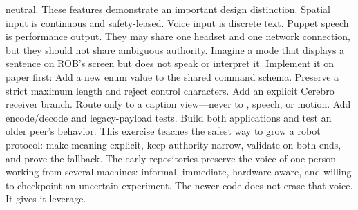 {}neutral.\markdownRendererUlItemEnd 
\markdownRendererUlEnd \markdownRendererInterblockSeparator
{}These features demonstrate an important design distinction. Spatial input is\markdownRendererSoftLineBreak
{}continuous and safety-leased. Voice input is discrete text. Puppet speech is\markdownRendererSoftLineBreak
{}performance output. They may share one headset and one network connection, but\markdownRendererSoftLineBreak
{}they should not share ambiguous authority.\markdownRendererInterblockSeparator
{}
\markdownRendererSectionEnd \markdownRendererSectionBegin
{}\markdownRendererInterblockSeparator
{}Imagine a  mode that displays a sentence on ROB's screen but does\markdownRendererSoftLineBreak
{}not speak or interpret it. Implement it on paper first:\markdownRendererInterblockSeparator
{}\markdownRendererOlBegin
{}Add a new enum value to the shared command schema.\markdownRendererOlItemEnd 
{}Preserve a strict maximum length and reject control characters.\markdownRendererOlItemEnd 
{}Add an explicit Cerebro receiver branch.\markdownRendererOlItemEnd 
{}Route only to a caption view—never to , speech, or motion.\markdownRendererOlItemEnd 
{}Add encode/decode and legacy-payload tests.\markdownRendererOlItemEnd 
{}Build both applications and test an older peer's behavior.\markdownRendererOlItemEnd 
\markdownRendererOlEnd \markdownRendererInterblockSeparator
{}This exercise teaches the safest way to grow a robot protocol: make meaning\markdownRendererSoftLineBreak
{}explicit, keep authority narrow, validate on both ends, and prove the fallback.\markdownRendererInterblockSeparator
{}\markdownRendererThematicBreak{}\markdownRendererInterblockSeparator
{}
\markdownRendererSectionEnd 
\markdownRendererSectionEnd \markdownRendererSectionBegin
{}\markdownRendererInterblockSeparator
{}The early repositories preserve the voice of one person working from several\markdownRendererSoftLineBreak
{}machines: informal, immediate, hardware-aware, and willing to checkpoint an\markdownRendererSoftLineBreak
{}uncertain experiment. The newer code does not erase that voice. It gives it\markdownRendererSoftLineBreak
{}leverage.\markdownRendererParagraphSeparator
